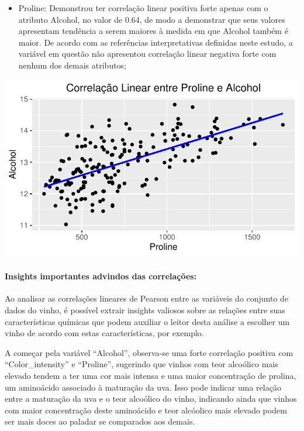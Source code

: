 \documentclass[
  letterpaper,
  DIV=11,
  numbers=noendperiod]{scrartcl}
\let\oldparagraph\paragraph
\renewcommand{\paragraph}[1]{\oldparagraph{#1}\mbox{}}
\providecommand{\tightlist}{%
  \setlength{\itemsep}{0pt}\setlength{\parskip}{0pt}}\usepackage{longtable,booktabs,array}
\begin{document}
\begin{itemize}
\tightlist
\item
  Proline: Demonstrou ter correlação linear positiva forte apenas com o
  atributo Alcohol, no valor de 0.64, de modo a demonstrar que seus
  valores apresentam tendência a serem maiores à medida em que Alcohol
  também é maior. De acordo com as referências interpretativas definidas
  neste estudo, a variável em questão não apresentou correlação linear
  negativa forte com nenhum dos demais atributos;
\end{itemize}

\begin{center}
\includegraphics{wines_analysis_files/figure-pdf/unnamed-chunk-17-1.pdf}
\end{center}

\paragraph{Insights importantes advindos das
correlações:}\label{insights-importantes-advindos-das-correlauxe7uxf5es}

Ao analisar as correlações lineares de Pearson entre as variáveis do
conjunto de dados do vinho, é possível extrair insights valiosos sobre
as relações entre suas características químicas que podem auxiliar o
leitor desta análise a escolher um vinho de acordo com estas
características, por exemplo.

A começar pela variável ``Alcohol'', observa-se uma forte correlação
positiva com ``Color\_intensity'' e ``Proline'', sugerindo que vinhos
com teor alcoólico mais elevado tendem a ter uma cor mais intensa e uma
maior concentração de prolina, um aminoácido associado à maturação da
uva. Isso pode indicar uma relação entre a maturação da uva e o teor
alcoólico do vinho, indicando ainda que vinhos com maior concentração
deste aminoácido e teor alcóolico mais elevado podem ser mais doces ao
paladar se comparados aos demais.
\end{document}
